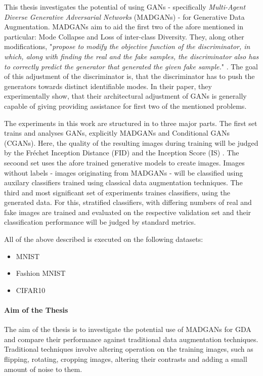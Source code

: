 This thesis investigates the potential of using GANs - specifically \textit{Multi-Agent Diverse Generative Adversarial Networks} (MADGANs) \cite{ghosh2018multiagentdiversegenerativeadversarial} - for Generative Data Augmentation. MADGANs aim to aid the first two of the afore mentioned in particular: Mode Collapse and Loss of inter-class Diversity. They, along other modifications, "\textit{propose to modify the objective function of the discriminator, in which, along with finding the real and the fake samples, the discriminator also has to correctly predict the generator that generated the given fake sample.}" \cite{ghosh2018multiagentdiversegenerativeadversarial}. The goal of this adjustment of the discriminator is, that the discriminator has to push the generators towards distinct identifiable modes. In their paper, they experimentally show, that their architectural adjustment of GANs is generally capable of giving providing assistance for first two of the mentioned problems.

The experiments in this work are structured in to three major parts.
The first set trains and analyses GANs, explicitly MADGANs and Conditional GANs (CGANs). Here, the quality of the resulting images during training will be judged by the Fréchet Inception Distance (FID) \cite{heusel2018ganstrainedtimescaleupdate} and the Inception Score (IS) \cite{salimans2016improvedtechniquestraininggans}.
The secoond set uses the afore trained generative models to create images. Images without labels - images originating from MADGANs - will be classified using auxilary classifiers trained using classical data augmentation techniques.
The third and most significant set of experiments traines classifiers, using the generated data. For this, stratified classifiers, with differing numbers of real and fake images are trained and evaluated on the respective validation set and their classification performance will be judged by standard metrics.


All of the above described is executed on the following datasets:
\begin{itemize}\label{used_datasets}
    \setlength{\itemsep}{-5pt}
    \item MNIST \cite{lecun2010mnist}
    \item Fashion MNIST \cite{xiao2017fashionmnist}
    \item CIFAR10 \cite{Krizhevsky2009learning}
\end{itemize}


\paragraph{Aim of the Thesis}\label{aim_of_the_thesis}
The aim of the thesis is to investigate the potential use of MADGANs for GDA and compare their performance against traditional data augmentation techniques. Traditional techniques involve altering operation on the training images, such as flipping, rotating, cropping images, altering their contrasts and adding a small amount of noise to them.


\newpage

